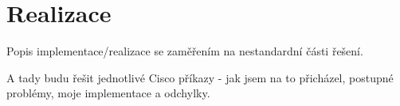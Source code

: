 \chapter{Realizace}
Popis implementace/realizace se zaměřením na nestandardní části řešení.

A tady budu řešit jednotlivé Cisco příkazy - jak jsem na to přicházel, postupné problémy, moje implementace a odchylky.